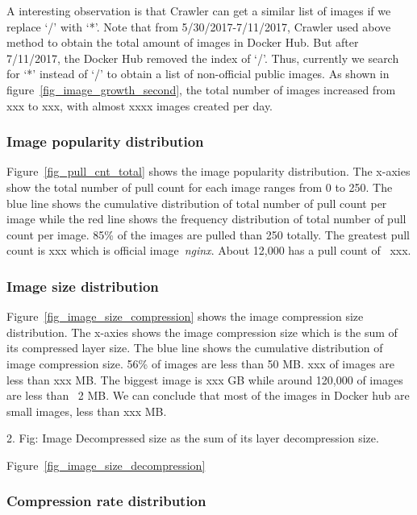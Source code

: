 A interesting observation is that Crawler can get a similar list of images if we replace `/' with `*'. Note that from 5/30/2017-7/11/2017, Crawler used above method to obtain the total amount of images in Docker Hub. But after 7/11/2017, the Docker Hub removed the index of `/'. Thus, currently we search for `*' instead of `/' to obtain a list of non-official public images. As shown in figure~\ref{fig_image_growth_second}, the total number of images increased from xxx to xxx, with almost xxxx images created per day.

\subsubsection{Image popularity distribution}


Figure~\ref{fig_pull_cnt_total} shows the image popularity distribution. The x-axies show the total number of pull count for each image ranges from 0 to 250. The blue line shows the cumulative distribution of total number of pull count per image while the red line shows the frequency distribution of total number of pull count per image. 85\% of the images are pulled than 250 totally. The greatest pull count is xxx which is official image~\textit{nginx}. About 12,000 has a pull count of ~xxx.

\subsubsection{Image size distribution}

Figure~\ref{fig_image_size_compression} shows the image compression size distribution. The x-axies shows the image compression size which is the sum of its compressed layer size. The blue line shows the cumulative distribution of image compression size. 56\% of images are less than 50 MB. xxx of images are less than xxx MB. The biggest image is xxx GB while around 120,000 of images are less than ~2 MB. We can conclude that most of the images in Docker hub are small images, less than xxx MB.

2. Fig: Image Decompressed size as the sum of its layer decompression size.

Figure~\ref{fig_image_size_decompression}

\subsubsection{Compression rate distribution}

